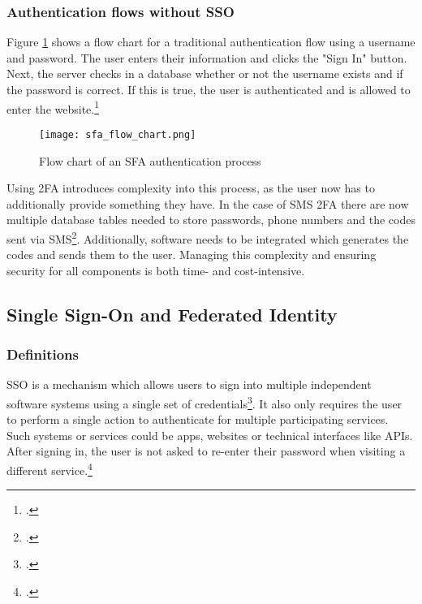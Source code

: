 \subsubsection{Authentication flows without SSO}

Figure \ref{fig:sfa_flow_chart} shows a flow chart for a traditional authentication flow using a username and password.
The user enters their information and clicks the "Sign In" button. Next, the server checks in a database
whether or not the username exists and if the password is correct. If this is true, the user is authenticated
and is allowed to enter the website.\footcite[Cp.][p. 400]{Basavala2012}

\begin{figure}[H]
    \centering
    \caption{Flow chart of an SFA authentication process}
	\label{fig:sfa_flow_chart}
    \texttt{[image: sfa\_flow\_chart.png]}
    \\
    \cite[Source:][]{Basavala2012}
\end{figure}

Using \ac{2FA} introduces complexity into this process, as the user now has to additionally provide something they have.
In the case of \ac{SMS} \ac{2FA} there are now multiple database tables needed to store passwords,
phone numbers and the codes sent via \ac{SMS}\footcite[Cp.][p. 400]{Basavala2012}. 
Additionally, software needs to be integrated which generates the
codes and sends them to the user.
Managing this complexity and ensuring security for all components is both time- and cost-intensive.

\newpage

\subsection{Single Sign-On and Federated Identity}
\label{sec:sso_fim}
\subsubsection{Definitions}

\ac{SSO} is a mechanism which allows users to sign into multiple independent software systems
using a single set of credentials\footcite[Cp.][134]{Radha2012}.
It also only requires the user to perform a single action to authenticate for multiple participating services.
Such systems or services could be apps, websites or technical interfaces like \acp{API}.
After signing in, the user is not asked to re-enter their password when visiting a different service.\footcite[Cp.][p. 18]{Bazaz2016}


